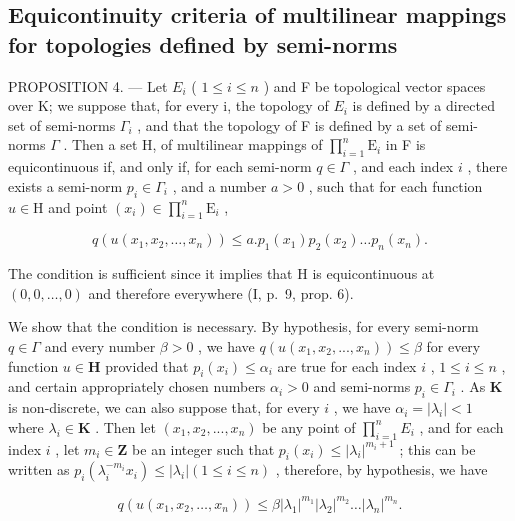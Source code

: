 \subsection{Equicontinuity criteria of multilinear mappings for topologies defined by semi-norms}

PROPOSITION 4. --- Let \(E_{i}\) ( \(1 \leqslant i \leqslant n\) ) and F be topological vector spaces over K; we suppose that, for every i, the topology of \(E_{i}\) is defined by a directed set of semi-norms \(\Gamma_{i}\) , and that the topology of F is defined by a set of semi-norms \(\Gamma\) . Then a set H, of multilinear mappings of \(\prod_{i=1}^{n} \mathrm{E}_{i}\) in F is equicontinuous if, and only if, for each semi-norm \(q \in \Gamma\) , and each index \(i\) , there exists a semi-norm \(p_{i} \in \Gamma_{i}\) , and a number \(a > 0\) , such that for each function \(u \in \mathrm{H}\) and point \((x_{i}) \in \prod_{i=1}^{n} \mathrm{E}_{i}\) ,

\[
q \left(u \left(x _ {1}, x _ {2}, \dots , x _ {n}\right)\right) \leqslant a. p _ {1} \left(x _ {1}\right) p _ {2} \left(x _ {2}\right) \dots p _ {n} \left(x _ {n}\right).\tag{5}
\]

The condition is sufficient since it implies that H is equicontinuous at \((0, 0, \ldots, 0)\) and therefore everywhere (I, p.~9, prop. 6).

We show that the condition is necessary. By hypothesis, for every semi-norm \(q \in \Gamma\) and every number \(\beta > 0\) , we have \(q(u(x_1, x_2, ..., x_n)) \leqslant \beta\) for every function \(u \in \mathbf{H}\) provided that \(p_i(x_i) \leqslant \alpha_i\) are true for each index \(i\) , \(1 \leqslant i \leqslant n\) , and certain appropriately chosen numbers \(\alpha_i > 0\) and semi-norms \(p_i \in \Gamma_i\) . As \(\mathbf{K}\) is non-discrete, we can also suppose that, for every \(i\) , we have \(\alpha_i = |\lambda_i| < 1\) where \(\lambda_i \in \mathbf{K}\) . Then let \((x_1, x_2, ..., x_n)\) be any point of \(\prod_{i=1}^{n} E_i\) , and for each index \(i\) , let \(m_i \in \mathbf{Z}\) be an integer such that \(p_i(x_i) \leqslant |\lambda_i|^{m_i + 1}\) ; this can be written as \(p_i(\lambda_i^{-m_i} x_i) \leqslant |\lambda_i| (1 \leqslant i \leqslant n)\) , therefore, by hypothesis, we have

\[
q \left(u \left(x _ {1}, x _ {2}, \dots , x _ {n}\right)\right) \leqslant \beta \left| \lambda_ {1} \right| ^ {m _ {1}} \left| \lambda_ {2} \right| ^ {m _ {2}} \dots \left| \lambda_ {n} \right| ^ {m _ {n}}.\tag{6}
\]

